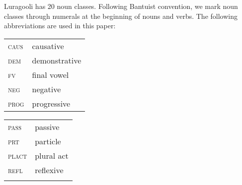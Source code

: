 \documentclass[output=paper]{langsci/langscibook}
\begin{document}
Luragooli has 20 noun classes. Following Bantuist convention, we mark noun classes through numerals at the beginning of nouns and verbs. The following abbreviations are used in this paper: 

\begin{tabularx}{.45\textwidth}{lX}
\textsc{caus} & causative  \\
\textsc{dem} & demonstrative  \\
\textsc{fv} & final vowel \\
\textsc{neg} & negative    \\
\textsc{prog} & progressive  \\
\end{tabularx}
\begin{tabularx}{.45\textwidth}{lX}
\textsc{pass} & passive  \\
\textsc{prt} & particle    \\
\textsc{plact} & plural act  \\
\textsc{refl} & reflexive \\
\\
\end{tabularx}


\printbibliography[heading=subbibliography,notkeyword=this]
\end{document}
